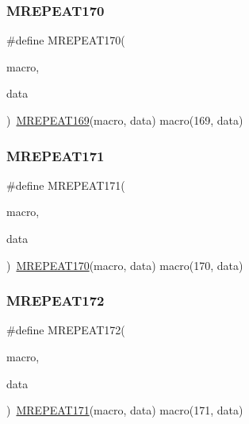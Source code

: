 \mbox{\label{group__group__sam0__utils__mrepeat_gaf79db8520fe014aa43b33eca106b66df}} 
\subsubsection{\texorpdfstring{MREPEAT170}{MREPEAT170}}
{\footnotesize\ttfamily \#define M\+R\+E\+P\+E\+A\+T170(\begin{DoxyParamCaption}\item[{}]{macro,  }\item[{}]{data }\end{DoxyParamCaption})~\mbox{\hyperlink{group__group__sam0__utils__mrepeat_ga1ae14784af3853b01de5837b32a0fdd6}{M\+R\+E\+P\+E\+A\+T169}}(macro, data)   macro(169, data)}

\mbox{\label{group__group__sam0__utils__mrepeat_ga4f35da901f3f846301ba22c2ebfd64a4}} 
\subsubsection{\texorpdfstring{MREPEAT171}{MREPEAT171}}
{\footnotesize\ttfamily \#define M\+R\+E\+P\+E\+A\+T171(\begin{DoxyParamCaption}\item[{}]{macro,  }\item[{}]{data }\end{DoxyParamCaption})~\mbox{\hyperlink{group__group__sam0__utils__mrepeat_gaf79db8520fe014aa43b33eca106b66df}{M\+R\+E\+P\+E\+A\+T170}}(macro, data)   macro(170, data)}

\mbox{\label{group__group__sam0__utils__mrepeat_ga6eb1cc1bab798bbc69ffcf54897bb268}} 
\subsubsection{\texorpdfstring{MREPEAT172}{MREPEAT172}}
{\footnotesize\ttfamily \#define M\+R\+E\+P\+E\+A\+T172(\begin{DoxyParamCaption}\item[{}]{macro,  }\item[{}]{data }\end{DoxyParamCaption})~\mbox{\hyperlink{group__group__sam0__utils__mrepeat_ga4f35da901f3f846301ba22c2ebfd64a4}{M\+R\+E\+P\+E\+A\+T171}}(macro, data)   macro(171, data)}

